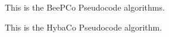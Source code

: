 This is the BeePCo Pseudocode algorithms\cite{Caliskanelli2015}.

This is the HybaCo Pseudocode algorithm\cite{Broecker2015Demo}.








